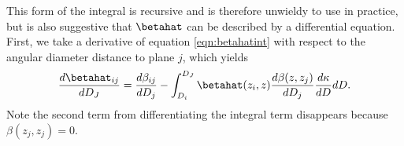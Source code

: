 This form of the integral is recursive and is therefore unwieldy to use in practice, but is also suggestive that $\betahat$ can be described by a differential equation. First, we take a derivative of equation \ref{eqn:betahatint} with respect to the angular diameter distance to plane $j$, which yields
\begin{equation}
\frac{d\betahat_{i j}}{d D_J} = \frac{d\beta_{i j}}{d D_j} - \int_{D_i}^{D_J} \betahat(z_i, z) \frac{d \beta(z, z_j)}{d D_j} \frac{d \kappa}{d D} d D.
\end{equation}
Note the second term from differentiating the integral term disappears because $\beta(z_j, z_j) = 0$. 